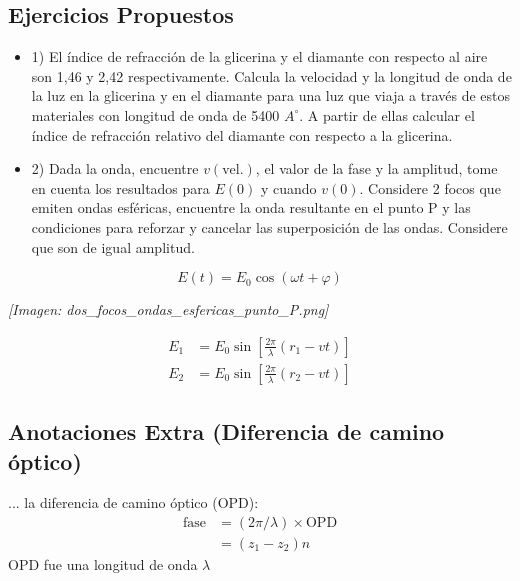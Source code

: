 \documentclass[12pt]{article}
\begin{document}
	\subsection{Ejercicios Propuestos}
	\begin{itemize}
		\item 1) El índice de refracción de la glicerina y el diamante con respecto al aire son 1,46 y 2,42 respectivamente. Calcula la velocidad y la longitud de onda de la luz en la glicerina y en el diamante para una luz que viaja a través de estos materiales con longitud de onda de 5400 $A^\circ$. A partir de ellas calcular el índice de refracción relativo del diamante con respecto a la glicerina.
		\item 2) Dada la onda, encuentre $v(\text{vel.})$, el valor de la fase y la amplitud, tome en cuenta los resultados para $E(0)$ y cuando $v(0)$. Considere 2 focos que emiten ondas esféricas, encuentre la onda resultante en el punto P y las condiciones para reforzar y cancelar las superposición de las ondas. Considere que son de igual amplitud.
	\end{itemize}
	
	\begin{equation*}
		E(t) = E_0\cos(\omega t + \varphi)
	\end{equation*}
	\begin{minipage}{0.4\textwidth}
		\textit{[Imagen: dos\_focos\_ondas\_esfericas\_punto\_P.png]}
	\end{minipage}
	\begin{minipage}{0.5\textwidth}
		\begin{align*}
			E_1 &= E_0 \sin\left[\frac{2\pi}{\lambda}(r_1 - vt)\right] \\
			E_2 &= E_0 \sin\left[\frac{2\pi}{\lambda}(r_2 - vt)\right]
		\end{align*}
	\end{minipage}
	
	\subsection{Anotaciones Extra (Diferencia de camino óptico)}
	... la diferencia de camino óptico (OPD):
	\begin{align*}
		\text{fase} &= (2\pi / \lambda) \times \text{OPD} \\
		&= (z_1 - z_2)n
	\end{align*}
	OPD fue una longitud de onda $\lambda$
	
\end{document}
